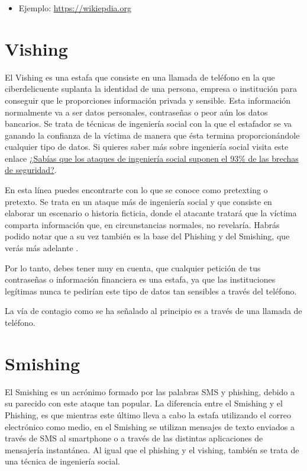\documentclass[
  a4paper,
  openany]{book}
\providecommand{\tightlist}{%
  \setlength{\itemsep}{0pt}\setlength{\parskip}{0pt}}
\begin{document}
\begin{itemize}
\tightlist
\item
  Ejemplo: \url{https://wikiepdia.org}
\end{itemize}

\hypertarget{vishing}{%
\section{Vishing}\label{vishing}}

El Vishing es una estafa que consiste en una llamada de teléfono en la que ciberdelicuente suplanta la identidad de una persona, empresa o institución para conseguir que le proporciones información privada y sensible. Esta información normalmente va a ser datos personales, contraseñas o peor aún los datos bancarios. Se trata de técnicas de ingeniería social con la que el estafador se va ganando la confianza de la víctima de manera que ésta termina proporcionándole cualquier tipo de datos. Si quieres saber más sobre ingeniería social visita este enlace \href{https://www.osi.es/es/actualidad/blog/2019/12/04/sabias-que-los-ataques-de-ingenieria-social-suponen-el-93-de-las-brechas}{¿Sabías que los ataques de ingeniería social suponen el 93\% de las brechas de seguridad?}.

En esta línea puedes encontrarte con lo que se conoce como pretexting o pretexto. Se trata en un ataque más de ingeniería social y que consiste en elaborar un
escenario o historia ficticia, donde el atacante tratará que la víctima comparta información que, en circunstancias normales, no revelaría. Habrás podido notar que a su vez también es la base del Phishing y del Smishing, que verás más adelante \citep{RZ-pretexting}.

Por lo tanto, debes tener muy en cuenta, que cualquier petición de tus contraseñas o información financiera es una estafa, ya que las instituciones legítimas nunca te pedirían este tipo de datos tan sensibles a través del teléfono.

La vía de contagio como se ha señalado al principio es a través de una llamada de teléfono.

\hypertarget{smishing}{%
\section{Smishing}\label{smishing}}

El Smishing es un acrónimo formado por las palabras SMS y phishing, debido a su parecido con este ataque tan popular. La diferencia entre el Smishing y el Phishing, es que mientras este último lleva a cabo la estafa utilizando el correo electrónico como medio, en el Smishing se utilizan mensajes de texto enviados a través de SMS al smartphone o a través de las distintas aplicaciones de mensajería instantánea. Al igual que el phishing y el vishing, también se trata de una técnica de ingeniería social.
\end{document}
